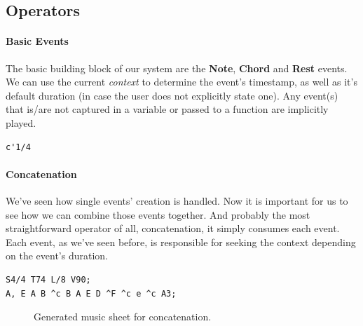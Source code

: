 \documentclass[a4paper,UKenglish,cleveref, autoref]{oasics-v2019}
\begin{document}
\subsection{Operators}

\paragraph*{Basic Events}
The basic building block of our system are the \textbf{Note}, \textbf{Chord} and \textbf{Rest} events. We can use the current \textit{context} to determine the event's timestamp, as well as it's default duration (in case the user does not explicitly state one). Any event(s) that is/are not captured in a variable or passed to a function are implicitly played.

\begin{lstlisting}[caption={Creating a Note Event},label=list:8-6,captionpos=t,abovecaptionskip=-\medskipamount]
c'1/4
\end{lstlisting}

\paragraph*{Concatenation}
We've seen how single events' creation is handled. Now it is important for us to see how we can combine those events together. And probably the most straightforward operator of all, concatenation, it simply consumes each event. Each event, as we've seen before, is responsible for seeking the context depending on the event's duration.
\begin{lstlisting}[caption={Snippet of Wet Hands by C418},label=list:8-6,captionpos=t,abovecaptionskip=-\medskipamount]
S4/4 T74 L/8 V90;
A, E A B ^c B A E D ^F ^c e ^c A3;
\end{lstlisting}

\begin{figure}[h]
  \centering
  {%
  \setlength{\fboxsep}{0pt}%
  \setlength{\fboxrule}{0pt}%
  }%
  \caption{Generated music sheet for concatenation\protect\footnotemark.}
  \label{fig:concatenation}
\end{figure}

\end{document}
